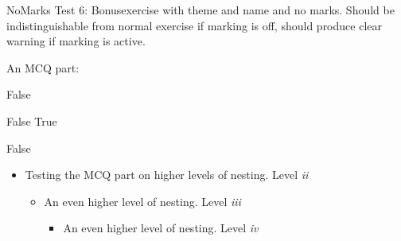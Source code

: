 \documentclass[pdftex,final,formula,logo,german]{hofuniversity}
\begin{document}
\begin{bonusexercise}{}{No}{Marks}
  Test 6: Bonusexercise with theme and name and no marks. Should be
  indistinguishable from normal exercise if marking is off, should
  produce clear warning if marking is active.

  An MCQ part:
  \begin{mcq}
    \item False
    \item False
      \checkedItem True
    \item False
  \end{mcq}
  \begin{itemize}
  \item Testing the MCQ part on higher levels of nesting. Level \emph{ii}
    \begin{itemize}
    \item An even higher level of nesting. Level \emph{iii}
      \begin{itemize}
      \item An even higher level of nesting. Level \emph{iv}
      \end{itemize}
    \end{itemize}
  \end{itemize}
\end{bonusexercise}
\end{document}
